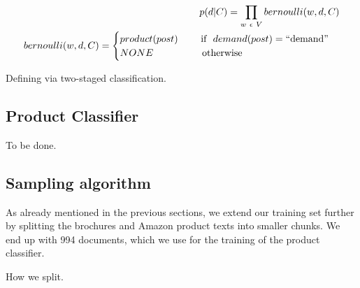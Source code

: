\begin{equationBlock}
\begin{alignat}{3}
	p(d|C)=\prod_{w~\epsilon~V}^{}bernoulli(w,d,C) \\
	bernoulli(w,d,C)=
	\begin{cases}
		product(post)~~~~~~~\text{if }~demand(post) = \operatorname{``demand''} \\
		NONE~~~~~~~~~~~~~~~\text{otherwise}
	\end{cases}
	\end{alignat}
	\caption{Defining \nto via two-staged classification.}
\end{equationBlock}

\subsection{Product Classifier}
To be done.

\subsection{Sampling algorithm}
As already mentioned in the previous sections, we extend our training set further by splitting the brochures and Amazon product texts into smaller chunks.
We end up with 994 documents, which we use for the training of the product classifier.

How we split.

